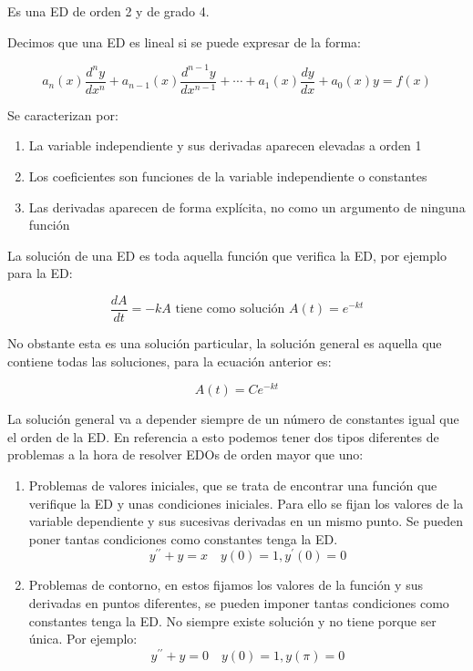 \documentclass[a4paper,12pt,titlepage]{article}
\begin{document}
Es una ED de orden 2 y de grado 4.

\par Decimos que una ED es lineal si se puede expresar de la forma:

\begin{equation*}
    a_n(x) \frac{d^n y}{d x^n}+a_{n-1}(x) \frac{d^{n-1} y}{d x^{n-1}}+\cdots+a_1(x) \frac{d y}{d x}+a_0(x) y=f(x)
\end{equation*}

\newpage

Se caracterizan por:

\begin{enumerate}
    \item La variable independiente y sus derivadas aparecen elevadas a orden 1
    \item Los coeficientes son funciones de la variable independiente o constantes
    \item Las derivadas aparecen de forma explícita, no como un argumento de ninguna función
\end{enumerate}

La solución de una ED es toda aquella función que verifica la ED, por ejemplo para la ED:

\begin{equation*}
    \frac{dA}{dt} = -kA \text{ tiene como solución } A(t)=e^{-kt}
\end{equation*}

No obstante esta es una solución particular, la solución general es aquella que contiene todas las soluciones, para la ecuación anterior es:

\begin{equation*}
    A(t) = Ce^{-kt}
\end{equation*}

La solución general va a depender siempre de un número de constantes igual que el orden de la ED. En referencia a esto podemos tener dos tipos diferentes de problemas a la hora de resolver EDOs de orden mayor que uno:

\begin{enumerate}
    \item Problemas de valores iniciales, que se trata de encontrar una función que verifique la ED y unas condiciones iniciales. Para ello se fijan los valores de la variable dependiente y sus sucesivas derivadas en un mismo punto. Se pueden poner tantas condiciones como constantes tenga la ED.
    \begin{equation*}
        y^{\prime \prime} + y =x\quad y(0)=1,y^{\prime}(0)=0
    \end{equation*}
    \item Problemas de contorno, en estos fijamos los valores de la función y sus derivadas en puntos diferentes, se pueden imponer tantas condiciones como constantes tenga la ED. No siempre existe solución y no tiene porque ser única. Por ejemplo:
    \begin{equation*}
        y^{\prime \prime} + y =0 \quad y(0)=1,y(\pi)=0
    \end{equation*}
\end{enumerate}
\end{document}
